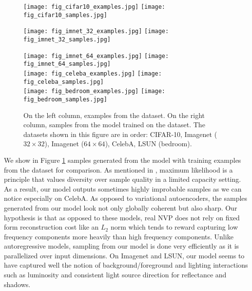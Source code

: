 \documentclass{article}
\begin{document}
\begin{figure}
\begin{center}
    \texttt{[image: fig\_cifar10\_examples.jpg]} \hfill
    \texttt{[image: fig\_cifar10\_samples.jpg]} \\\vspace{1mm}

    \texttt{[image: fig\_imnet\_32\_examples.jpg]} \hfill
    \texttt{[image: fig\_imnet\_32\_samples.jpg]} \\\vspace{1mm}

    \texttt{[image: fig\_imnet\_64\_examples.jpg]} \hfill
    \texttt{[image: fig\_imnet\_64\_samples.jpg]} \\\vspace{1mm}
    \texttt{[image: fig\_celeba\_examples.jpg]} \hfill
    \texttt{[image: fig\_celeba\_samples.jpg]} \\\vspace{1mm}
    \texttt{[image: fig\_bedroom\_examples.jpg]} \hfill
    \texttt{[image: fig\_bedroom\_samples.jpg]} \caption{On the left column, examples from the dataset. On the right column, samples from the model trained on the dataset. The datasets shown in this figure are in order: CIFAR-10, Imagenet ($32 \times 32$), Imagenet ($64 \times 64$), CelebA, LSUN (bedroom).}
    \label{fig:samples}
\end{center}
\end{figure}

We show in Figure \ref{fig:samples} samples generated from the model with training examples from the dataset for comparison. As mentioned in \citep{DBLP:journals/corr/TheisOB15, gregor2016towards}, maximum likelihood is a principle that values diversity over sample quality in a limited capacity setting. As a result, our model outputs sometimes highly improbable samples as we can notice especially on CelebA. As opposed to variational autoencoders, the samples generated from our model look not only globally coherent but also sharp. Our hypothesis is that as opposed to these models, real NVP does not rely on fixed form reconstruction cost like an $L_{2}$ norm which tends to reward capturing low frequency components more heavily than high frequency components. Unlike autoregressive models, sampling from our model is done very efficiently as it is parallelized over input dimensions. On Imagenet and LSUN, our model seems to have captured well the notion of background/foreground and lighting interactions such as luminosity and consistent light source direction for reflectance and shadows. 
\end{document}
